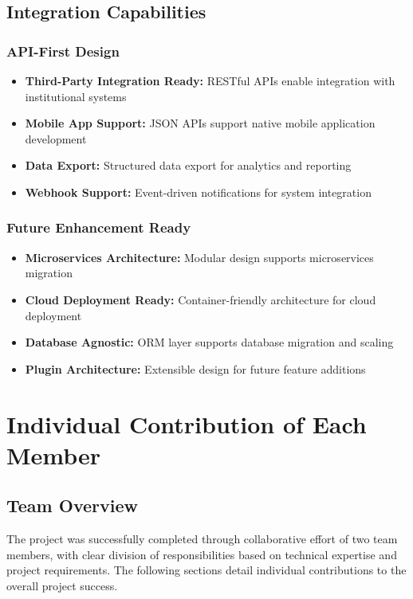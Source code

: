 \documentclass[12pt,a4paper]{report}
\begin{document}
\section{Integration Capabilities}

\subsection{API-First Design}
\begin{itemize}
    \item \textbf{Third-Party Integration Ready:} RESTful APIs enable integration with institutional systems
    \item \textbf{Mobile App Support:} JSON APIs support native mobile application development
    \item \textbf{Data Export:} Structured data export for analytics and reporting
    \item \textbf{Webhook Support:} Event-driven notifications for system integration
\end{itemize}

\subsection{Future Enhancement Ready}
\begin{itemize}
    \item \textbf{Microservices Architecture:} Modular design supports microservices migration
    \item \textbf{Cloud Deployment Ready:} Container-friendly architecture for cloud deployment
    \item \textbf{Database Agnostic:} ORM layer supports database migration and scaling
    \item \textbf{Plugin Architecture:} Extensible design for future feature additions
\end{itemize}

\chapter{Individual Contribution of Each Member}
\label{chap:contributions}

\section{Team Overview}
The project was successfully completed through collaborative effort of two team members, with clear division of responsibilities based on technical expertise and project requirements. The following sections detail individual contributions to the overall project success.
\end{document}

